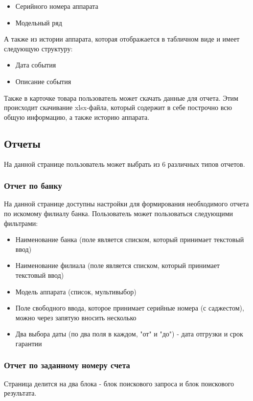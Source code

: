 \documentclass[DIV=calc, paper=a4, fontsize=11pt]{scrartcl} %
\begin{document}
\begin{itemize}
	\item Серийного номера аппарата
	\item Модельный ряд
\end{itemize}

А также из истории аппарата, которая отображается в табличном виде и имеет следующую структуру:

\begin{itemize}
	\item Дата события
	\item Описание события
\end{itemize}

Также в карточке товара пользователь может скачать данные для отчета. Этим происходит скачивание xlsx-файла, который содержит в себе построчно всю общую информацию, а также историю аппарата.


\subsection{Отчеты}
На данной странице пользователь может выбрать из 6 различных типов отчетов.

\subsubsection{Отчет по банку}
На данной странице доступны настройки для формирования необходимого отчета по искомому филиалу банка. Пользователь может пользоваться следующими фильтрами:

\begin{itemize}
	\item Наименование банка (поле является списком, который принимает текстовый ввод)
	\item Наименование филиала (поле является списком, который принимает текстовый ввод)
	\item Модель аппарата (список, мультивыбор)
	\item Поле свободного ввода, которое принимает серийные номера (с саджестом), можно через запятую вносить несколько
	\item Два выбора даты (по два поля в каждом, "от" и "до") - дата отгрузки и срок гарантии
\end{itemize}

\subsubsection{Отчет по заданному номеру счета}
Страница делится на два блока - блок поискового запроса и блок поискового результата.
\end{document}
